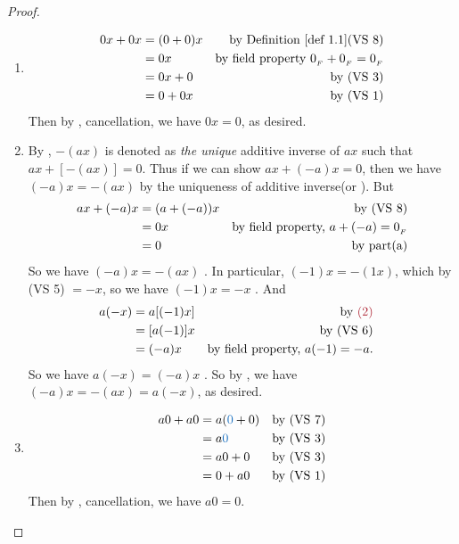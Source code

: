 \begin{proof}
\begin{enumerate}
\item
    \begin{align*}
        0x + 0x & = (0 + 0)x & \text{by \DEF{1.1}(VS 8)} \\
                & = 0x & \text{by field property \(\OF + \OF = \OF\)} \\
                & = 0x + 0 & \text{by (VS 3)} \\
                & = 0 + 0x & \text{by (VS 1)}
    \end{align*}
    Then by , cancellation, we have \(0x = 0\), as desired.
\item
    By , \(-(ax)\) is denoted as \emph{the unique} additive inverse of \(ax\) such that \(ax + [-(ax)] = 0\).
    Thus if we can show \(ax + (-a)x = 0\), then we have \((-a)x = -(ax)\) by the uniqueness of additive inverse(or ).
    But
    \begin{align*}
        ax + (-a)x & = (a + (-a))x & \text{by (VS 8)} \\
                   & = 0x & \text{by field property, \(a + (-a) = 0_{_F}\)} \\
                   & = 0 & \text{by part(a)}
    \end{align*}
    So we have \((-a)x = -(ax)\) .
    In particular, \((-1) x = -(1x)\), which by (VS 5) \(= -x\), so we have \((-1)x = -x\) .
    And
    \begin{align*}
        a(-x) & = a[(-1)x] & \text{by \MAROON{(2)}} \\
              & = [a(-1)]x & \text{by (VS 6)} & \\
              & = (-a)x & \text{by field property, \(a(-1) = -a\)}.
    \end{align*}
    So we have \(a(-x) = (-a)x\) .
    So by , we have \((-a)x = -(ax) = a(-x)\), as desired.
\item
    \begin{align*}
        a0 + a0 & = a(\BLUE{0} + 0) & \text{by (VS 7)} \\
                & = a\BLUE{0} & \text{by (VS 3)} \\
                & = a0 + 0 & \text{by (VS 3)} \\
                & = 0 + a0 & \text{by (VS 1)}
    \end{align*}
    Then by , cancellation, we have \(a0 = 0\).
\end{enumerate}
\end{proof}

